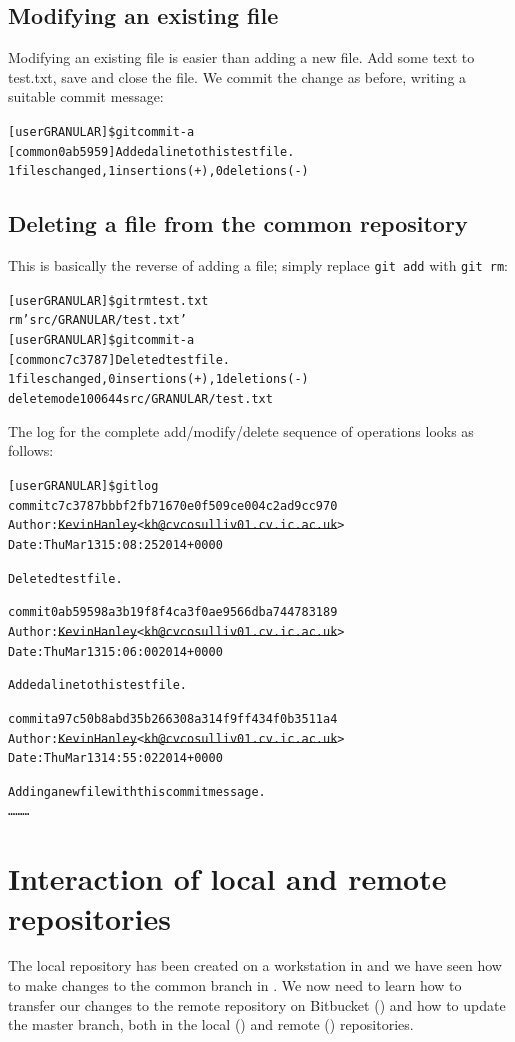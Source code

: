 \documentclass[a4paper,oneside,11pt]{article}
\begin{document}
\subsection{Modifying an existing file}
Modifying an existing file is easier than adding a new file. Add some text to test.txt, save and close the file. We commit the change as before, writing a suitable commit message:
\begin{alltt}
[user GRANULAR]\$ git commit -a
[common 0ab5959] Added a line to this test file.
 1 files changed, 1 insertions(+), 0 deletions(-)
\end{alltt}

\subsection{Deleting a file from the common repository}\label{ssec:dfcr}
This is basically the reverse of adding a file; simply replace \texttt{git add} with \texttt{git rm}:
\begin{alltt}
[user GRANULAR]\$ git rm test.txt
rm 'src/GRANULAR/test.txt'
[user GRANULAR]\$ git commit -a
[common c7c3787] Deleted test file.
 1 files changed, 0 insertions(+), 1 deletions(-)
 delete mode 100644 src/GRANULAR/test.txt
\end{alltt}

The log for the complete add\slash modify\slash delete sequence of operations looks as follows:
\begin{alltt}
[user GRANULAR]\$ git log
commit c7c3787bbbf2fb71670e0f509ce004c2ad9cc970
Author: \sout{Kevin Hanley} <\sout{kh@cvcosulliv01.cv.ic.ac.uk}>
Date:   Thu Mar 13 15:08:25 2014 +0000

    Deleted test file.

commit 0ab59598a3b19f8f4ca3f0ae9566dba744783189
Author: \sout{Kevin Hanley} <\sout{kh@cvcosulliv01.cv.ic.ac.uk}>
Date:   Thu Mar 13 15:06:00 2014 +0000

    Added a line to this test file.

commit a97c50b8abd35b266308a314f9ff434f0b3511a4
Author: \sout{Kevin Hanley} <\sout{kh@cvcosulliv01.cv.ic.ac.uk}>
Date:   Thu Mar 13 14:55:02 2014 +0000

    Adding a new file with this commit message.
\ldots\hspace*{10em}\ldots\hspace*{10em}\ldots
\end{alltt}

\section{Interaction of local and remote repositories}\label{sec:ilrr}
The local repository has been created on a workstation in  and we have seen how to make changes to the common branch in . We now need to learn how to transfer our changes to the remote repository on Bitbucket () and how to update the master branch, both in the local () and remote () repositories.
\end{document}
